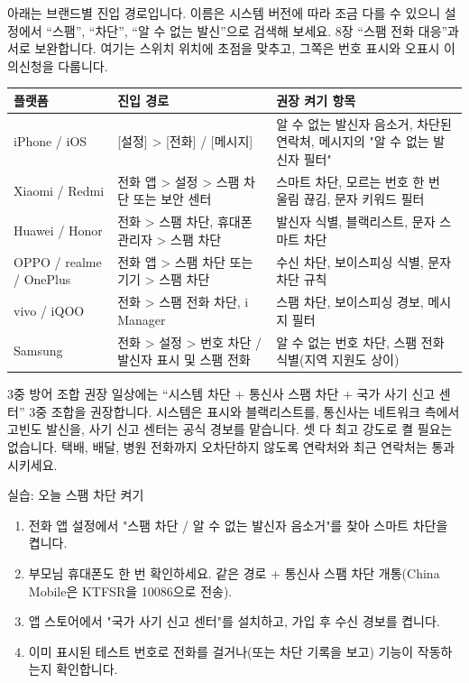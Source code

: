 
아래는 브랜드별 진입 경로입니다. 이름은 시스템 버전에 따라 조금 다를 수 있으니 설정에서 “스팸”, “차단”, “알 수 없는 발신”으로 검색해 보세요. 8장 “스팸 전화 대응”과 서로 보완합니다. 여기는 스위치 위치에 초점을 맞추고, 그쪽은 번호 표시와 오표시 이의신청을 다룹니다.

\begin{center}
\begin{tabularx}{\linewidth}{|X|X|X|}
\hline
\textbf{플랫폼} & \textbf{진입 경로} & \textbf{권장 켜기 항목} \tabularnewline
\hline
iPhone / iOS & {}[설정] > [전화] / [메시지] & 알 수 없는 발신자 음소거, 차단된 연락처, 메시지의 "알 수 없는 발신자 필터" \tabularnewline
Xiaomi / Redmi & 전화 앱 > 설정 > 스팸 차단 또는 보안 센터 & 스마트 차단, 모르는 번호 한 번 울림 끊김, 문자 키워드 필터 \tabularnewline
Huawei / Honor & 전화 > 스팸 차단, 휴대폰 관리자 > 스팸 차단 & 발신자 식별, 블랙리스트, 문자 스마트 차단 \tabularnewline
OPPO / realme / OnePlus & 전화 앱 > 스팸 차단 또는 기기 > 스팸 차단 & 수신 차단, 보이스피싱 식별, 문자 차단 규칙 \tabularnewline
vivo / iQOO & 전화 > 스팸 전화 차단, i Manager & 스팸 차단, 보이스피싱 경보, 메시지 필터 \tabularnewline
Samsung & 전화 > 설정 > 번호 차단 / 발신자 표시 및 스팸 전화 & 알 수 없는 번호 차단, 스팸 전화 식별(지역 지원도 상이) \tabularnewline
\hline
\end{tabularx}
\end{center}

\begin{tcbinfo}{3중 방어 조합 권장}
일상에는 “시스템 차단 + 통신사 스팸 차단 + 국가 사기 신고 센터” 3중 조합을 권장합니다. 시스템은 표시와 블랙리스트를, 통신사는 네트워크 측에서 고빈도 발신을, 사기 신고 센터는 공식 경보를 맡습니다. 셋 다 최고 강도로 켤 필요는 없습니다. 택배, 배달, 병원 전화까지 오차단하지 않도록 연락처와 최근 연락처는 통과시키세요.

\end{tcbinfo}

\begin{tcbpractice}{실습: 오늘 스팸 차단 켜기}
\begin{enumerate}
  \item 전화 앱 설정에서 "스팸 차단 / 알 수 없는 발신자 음소거"를 찾아 스마트 차단을 켭니다.
  \item 부모님 휴대폰도 한 번 확인하세요. 같은 경로 + 통신사 스팸 차단 개통(China Mobile은 KTFSR을 10086으로 전송).
  \item 앱 스토어에서 "국가 사기 신고 센터"를 설치하고, 가입 후 수신 경보를 켭니다.
  \item 이미 표시된 테스트 번호로 전화를 걸거나(또는 차단 기록을 보고) 기능이 작동하는지 확인합니다.
\end{enumerate}

\end{tcbpractice}

